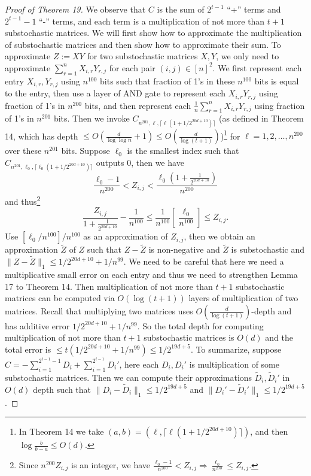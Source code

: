 \begin{proof}[Proof of Theorem 19]
We observe that $C$ is the sum of $2^{t-1}$ ``+'' terms and $2^{t-1}-1$ ``-'' terms, and each term is a multiplication of not more than $t+1$ substochastic matrices. We will first show how to approximate the multiplication of substochastic matrices and then show how to approximate their sum.
To approximate $Z:=XY$ for two substochastic matrices $X,Y$, we only need to approximate $\sum_{r=1}^n X_{i,r}Y_{r,j}$ for each pair $(i,j)\in[n]^2$. We first represent each entry $X_{i,r},Y_{r,j}$ using $n^{100}$ bits such that fraction of 1's in these $n^{100}$ bits is equal to the entry, then use a layer of AND gate to represent each $X_{i,r}Y_{r,j}$ using fraction of 1's in $n^{200}$ bits, and then represent each $\frac1n\sum_{r=1}^n X_{i,r}Y_{r,j}$ using fraction of 1's in $n^{201}$ bits. Then we invoke $C_{n^{201},\ell,\lceil\ell(1+1/2^{20d+10})\rceil}$ (as defined in Theorem 14, which has depth $\le O(\frac d{\log\log n}+1)\le O(\frac d{\log(t+1)})$)\footnote{In Theorem 14 we take $(a,b)=(\ell,\lceil\ell(1+1/2^{20d+10})\rceil)$, and then $\log\frac b{b-a}\le O(d)$.} for $\ell=1,2,\ldots,n^{200}$ over these $n^{201}$ bits. Suppose $\ell_0$ is the smallest index such that $C_{n^{201},\ell_0,\lceil\ell_0(1+1/2^{20d+10})\rceil}$ outputs 0, then we have
\[\frac{\ell_0-1}{n^{200}}<Z_{i,j}<\frac{\ell_0(1+\frac1{2^{20d+10}})}{n^{200}}\]
and thus\footnote{Since $n^{200}Z_{i,j}$ is an integer, we have $\frac{\ell_0-1}{n^{200}}<Z_{i,j}\Longrightarrow\frac{\ell_0}{n^{200}}\le Z_{i,j}$.}
\[\frac{Z_{i,j}}{1+\frac1{2^{20d+10}}}-\frac1{n^{100}}\le\frac1{n^{100}}\left[\frac{\ell_0}{n^{100}}\right]\le Z_{i,j}.\]
Use $[\ell_0/n^{100}]/n^{100}$ as an approximation of $Z_{i,j}$, then we obtain an approximation $\widetilde Z$ of $Z$ such that $Z-\widetilde Z$ is non-negative and $\widetilde Z$ is substochastic and $\|Z-\widetilde Z\|_1\le1/2^{20d+10}+1/n^{99}$. We need to be careful that here we need a multiplicative small error on each entry and thus we need to strengthen Lemma 17 to Theorem 14.
Then multiplication of not more than $t+1$ substochastic matrices can be computed via $O(\log(t+1))$ layers of multiplication of two matrices. Recall that multiplying two matrices uses $O(\frac d{\log(t+1)})$-depth and has additive error $1/2^{20d+10}+1/n^{99}$. So the total depth for computing multiplication of not more than $t+1$ substochastic matrices is $O(d)$ and the total error is $\le t(1/2^{20d+10}+1/n^{99})\le1/2^{19d+5}$.
To summarize, suppose $C=-\sum_{i=1}^{2^{t-1}-1}D_i+\sum_{i=1}^{2^{t-1}}D_i'$, here each $D_i,D_i'$ is multiplication of some substochastic matrices. Then we can compute their approximations $\widetilde D_i,\widetilde D_i'$ in $O(d)$ depth such that $\|D_i-\widetilde D_i\|_1\le1/2^{19d+5}$ and $\|D_i'-\widetilde D_i'\|_1\le1/2^{19d+5}$.

\end{proof}
